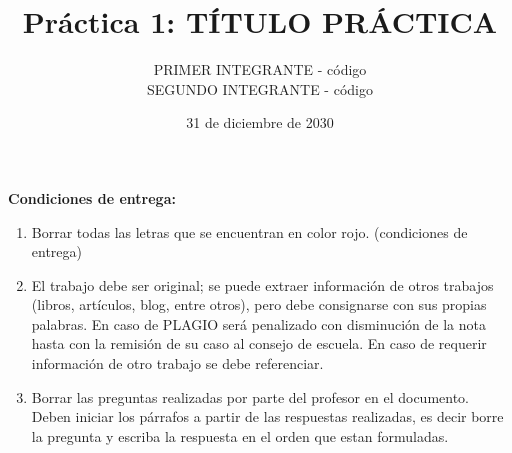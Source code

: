 \documentclass{journal}[IEEEtran, twocolumn]             %
\newcommand{\dochead}{Práctica 1}
\newcommand{\docsubhead}{TÍTULO PRÁCTICA}
\newcommand{\titulo}{\dochead: \docsubhead}
\newcommand{\fecha}{31 de diciembre de 2030}
\begin{document}

\title{\textbf{\titulo}}            %

\author{
PRIMER INTEGRANTE - código \\
SEGUNDO INTEGRANTE - código
}


\date{\fecha}                       %

\maketitle                          %
\thispagestyle{fancy}               %

%

\color{red}
\begin{center}
\textbf{Condiciones de entrega: }

\begin{enumerate}
\item Borrar todas las letras que se encuentran en color rojo. (condiciones de entrega) 
\item El trabajo debe ser original; se puede extraer información de otros trabajos (libros, artículos, blog, entre otros), pero debe consignarse con sus propias palabras. En caso de PLAGIO será penalizado con disminución de la nota hasta con la remisión de su caso al consejo de escuela. En caso de requerir información de otro trabajo se debe referenciar. 
\item Borrar las preguntas realizadas por parte del profesor en el documento. Deben iniciar los párrafos a partir de las respuestas realizadas, es decir  borre la pregunta y escriba la respuesta en el orden que estan formuladas.
\end{enumerate}

\end{center}
\color{black}
\end{document}
